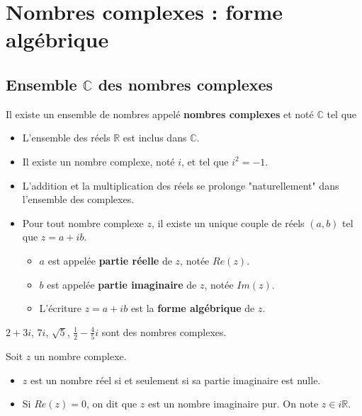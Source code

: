 \documentclass[11pt,fleqn, openany]{book} %
\begin{document}
\chapter{Nombres complexes : forme algébrique}


\section{Ensemble $\mathbb{C}$ des nombres complexes}

\begin{definition}Il existe un ensemble de nombres appelé \textbf{nombres complexes} et noté $\mathbb{C}$ tel que
\begin{itemize}
\item L'ensemble des réels $\mathbb{R}$ est inclus dans $\mathbb{C}$.
\item Il existe un nombre complexe, noté $i$, et tel que $i^2=-1$.
\item L'addition et la multiplication des réels se prolonge "naturellement" dans l'ensemble des complexes.
\item Pour tout nombre complexe $z$, il existe un unique couple de réels $(a,b)$ tel que $z=a+ib$.
\begin{itemize}
\item $a$ est appelée \textbf{partie réelle} de $z$, notée $Re(z)$.
\item $b$ est appelée \textbf{partie imaginaire} de $z$, notée $Im(z)$.
\item L'écriture $z=a+ib$ est la \textbf{forme algébrique} de $z$.
\end{itemize}
\end{itemize}\end{definition}

\begin{example}$2+3i$, $7i$, $\sqrt{5}$, $\frac{1}{2}-\frac{4}{5}i$ sont des nombres complexes.\end{example}

\begin{definition}Soit $z$ un nombre complexe.
\begin{itemize}
\item $z$ est un nombre réel si et seulement si sa partie imaginaire est nulle.
\item Si $Re(z)=0$, on dit que $z$ est un nombre imaginaire pur. On note $z \in i\mathbb{R}$.
\end{itemize}\end{definition}
\end{document}
